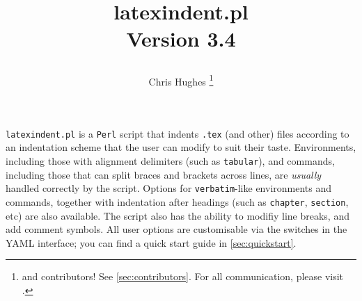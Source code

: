 \title{%
	\begin{tcolorbox}[
			width=5.2cm,
			boxrule=0pt,
			colframe=white!40!black,
			colback=white,
			rightrule=2pt,
			sharp corners,
			enhanced,
			overlay={\node[anchor=north east,outer sep=2pt] at ([xshift=3cm,yshift=4mm]frame.north east) {\texttt{[image: logo]}}; }]
		\centering\ttfamily\bfseries latexindent.pl\\[1cm] Version 3.4
	\end{tcolorbox}
}
\author{Chris Hughes \thanks{and contributors!
		See \vref{sec:contributors}.
		For all communication, please visit \cite{latexindent-home}.
	}}
\maketitle
\begin{adjustwidth}{1cm}{1cm}
	\small
	\texttt{latexindent.pl} is a \texttt{Perl} script that indents \texttt{.tex} (and other) files according to an indentation scheme that the user can modify to suit their taste.
	Environments, including those with alignment delimiters (such as \texttt{tabular}), and commands, including those that can split braces and brackets across lines, are \emph{usually} handled correctly by the script.
	Options for \texttt{verbatim}-like environments and commands, together with indentation after headings (such as \lstinline!chapter!, \lstinline!section!, etc) are also available.
	The script also has the ability to modifiy line breaks, and add comment symbols.
	All user options are customisable via the switches in the YAML interface; you can find a quick start guide in \vref{sec:quickstart}.
\end{adjustwidth}
